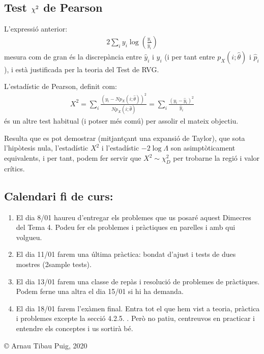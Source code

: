 \documentclass[letterpaper,10pt,english]{sphinxmanual}
\begin{document}
\subsection{Test \protect\(\chi^2\protect\) de Pearson}
\label{\detokenize{0_Intro/0_4_Tests:test-chi-2-de-pearson}}
L’expressió anterior:
\begin{equation*}
\begin{split}2 \sum_i y_i \log \left(\frac{y_i}{\hat{y}_i} \right)\end{split}
\end{equation*}
mesura com de gran és la discrepància entre \(\hat{y}_i\) i \(y_i\) (i per tant
entre \(p_X(i;\hat{\theta})\) i \(\hat{p}_i\)), i està
justificada per la teoria del Test de RVG.

L’estadístic de Pearson, definit com:
\begin{equation*}
\begin{split}X^2 = \sum_i \frac{\left(y_i - N p_X(i;\hat{\theta}) \right)^2}{ N p_X(i;\hat{\theta})} = \sum_i \frac{\left(y_i - \hat{y}_i\right)^2}{ \hat{y}_i}\end{split}
\end{equation*}
és un altre test habitual (i potser més comú) per assolir el mateix objectiu.

Resulta que es pot demostrar (mitjantçant una expansió de Taylor), que sota l’hipòtesis
nula, l’estadístic \(X^2\) i l’estadístic \(-2\log\Lambda\) son asimptòticament
equivalents, i per tant, podem fer servir que \(X^2 \sim \chi^2_D\) per trobar\sphinxhyphen{}ne la
regió i valor crítics.


\subsection{Calendari fi de curs:}
\label{\detokenize{0_Intro/0_4_Tests:calendari-fi-de-curs}}\begin{enumerate}
%
\item {} 
El dia 8/01 haureu d’entregar els problemes que us posaré aquest Dimecres del Tema 4. Podeu fer els problemes i pràctiques en parelles i amb qui volgueu.

\item {} 
El dia 11/01 farem una última pràctica: bondat d’ajust i tests de dues mostres (2\sphinxhyphen{}sample tests).

\item {} 
El dia 13/01 farem una classe de repàs i resolució de problemes de pràctiques. Podem fer\sphinxhyphen{}ne una altra el dia 15/01 si hi ha demanda.

\item {} 
El dia 18/01 farem l’exàmen final. Entra tot el que hem vist a teoria, pràctica i problemes excepte la secció 4.2.5. . Però no patiu, centreu\sphinxhyphen{}vos en practicar i entendre els conceptes i us sortirà bé.

\end{enumerate}

© Arnau Tibau Puig, 2020 



\renewcommand{\indexname}{Index}
\printindex
\end{document}
